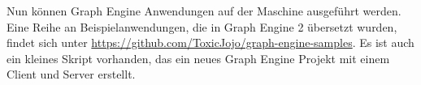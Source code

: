 Nun können Graph Engine Anwendungen auf der Maschine ausgeführt werden. 
Eine Reihe an Beispielanwendungen, die in Graph Engine 2 übersetzt wurden, findet sich unter \href{https://github.com/ToxicJojo/graph-engine-samples}{https://github.com/ToxicJojo/graph-engine-samples}. Es ist auch ein kleines Skript vorhanden, das ein neues Graph Engine Projekt mit einem Client und Server erstellt.
